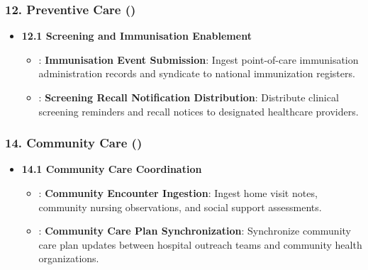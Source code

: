 \subsubsection*{12. Preventive Care (\texttt{})}
\label{rad:enabling:420}

\begin{itemize}

\item 
\textbf{12.1 Screening and Immunisation Enablement}


\begin{itemize}

\item 
\texttt{}: \textbf{Immunisation Event Submission}: Ingest point-of-care immunisation administration records and syndicate to national immunization registers.



\item 
\texttt{}: \textbf{Screening Recall Notification Distribution}: Distribute clinical screening reminders and recall notices to designated healthcare providers.



\end{itemize}


\end{itemize}
\label{rad:enabling:424}
\subsubsection*{14. Community Care (\texttt{})}
\label{rad:enabling:425}

\begin{itemize}

\item 
\textbf{14.1 Community Care Coordination}


\begin{itemize}

\item 
\texttt{}: \textbf{Community Encounter Ingestion}: Ingest home visit notes, community nursing observations, and social support assessments.



\item 
\texttt{}: \textbf{Community Care Plan Synchronization}: Synchronize community care plan updates between hospital outreach teams and community health organizations.



\end{itemize}


\end{itemize}
\label{rad:enabling:429}
